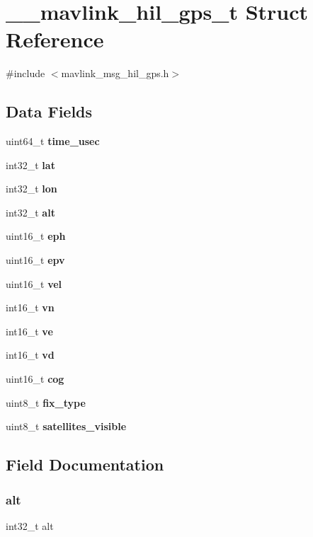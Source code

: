 \section{\+\_\+\+\_\+mavlink\+\_\+hil\+\_\+gps\+\_\+t Struct Reference}
\label{struct____mavlink__hil__gps__t}


{\ttfamily \#include $<$mavlink\+\_\+msg\+\_\+hil\+\_\+gps.\+h$>$}

\subsection*{Data Fields}
\begin{DoxyCompactItemize}
\item 
uint64\+\_\+t \textbf{ time\+\_\+usec}
\item 
int32\+\_\+t \textbf{ lat}
\item 
int32\+\_\+t \textbf{ lon}
\item 
int32\+\_\+t \textbf{ alt}
\item 
uint16\+\_\+t \textbf{ eph}
\item 
uint16\+\_\+t \textbf{ epv}
\item 
uint16\+\_\+t \textbf{ vel}
\item 
int16\+\_\+t \textbf{ vn}
\item 
int16\+\_\+t \textbf{ ve}
\item 
int16\+\_\+t \textbf{ vd}
\item 
uint16\+\_\+t \textbf{ cog}
\item 
uint8\+\_\+t \textbf{ fix\+\_\+type}
\item 
uint8\+\_\+t \textbf{ satellites\+\_\+visible}
\end{DoxyCompactItemize}


\subsection{Field Documentation}
\mbox{\label{struct____mavlink__hil__gps__t_a677cbc2ca7dc4e9f0516bd42110f0062}} 
\subsubsection{alt}
{\footnotesize\ttfamily int32\+\_\+t alt}

